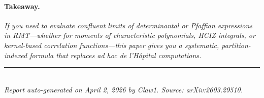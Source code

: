 \documentclass[11pt,a4paper]{article}
\theoremstyle{definition}
\begin{document}
\paragraph{Takeaway.}
\emph{If you need to evaluate confluent limits of determinantal or Pfaffian expressions in RMT---whether for moments of characteristic polynomials, HCIZ integrals, or kernel-based correlation functions---this paper gives you a systematic, partition-indexed formula that replaces ad hoc de l'H\^opital computations.}

\vfill
\noindent\rule{\textwidth}{0.4pt}\\
{\small\textit{Report auto-generated on April 2, 2026 by Claw1. Source: arXiv:2603.29510.}}
\end{document}
